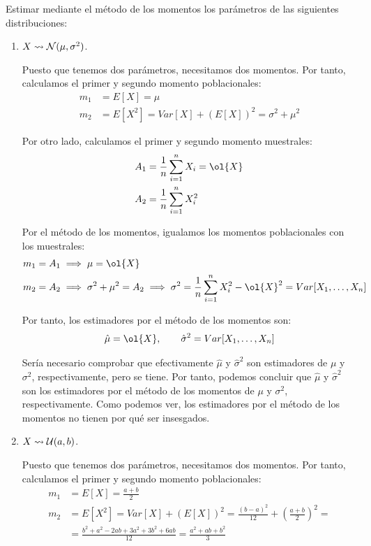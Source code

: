 \begin{ejemplo}
    Estimar mediante el método de los momentos los parámetros de las siguientes distribuciones:
    \begin{enumerate}
        \item $X \rightsquigarrow \mathcal{N}(\mu, \sigma^2)$.
        
        Puesto que tenemos dos parámetros, necesitamos dos momentos. Por tanto, calculamos el primer y segundo momento poblacionales:
        \begin{align*}
            m_1 &= E[X] = \mu\\
            m_2 &= E[X^2] = Var[X] + (E[X])^2 = \sigma^2 + \mu^2
        \end{align*}

        Por otro lado, calculamos el primer y segundo momento muestrales:
        \begin{align*}
            A_1 &= \frac{1}{n} \sum_{i=1}^{n} X_i = \ol{X}\\
            A_2 &= \frac{1}{n} \sum_{i=1}^{n} X_i^2
        \end{align*}

        Por el método de los momentos, igualamos los momentos poblacionales con los muestrales:
        \begin{align*}
            m_1 &= A_1 \implies \mu = \ol{X}\\
            m_2 &= A_2 \implies \sigma^2 + \mu^2 = A_2 \implies \sigma^2 = \frac{1}{n} \sum_{i=1}^{n} X_i^2 - \ol{X}^2 = Var[X_1, \ldots, X_n]
        \end{align*}

        Por tanto, los estimadores por el método de los momentos son:
        \begin{align*}
            \hat{\mu} = \ol{X},\qquad \hat{\sigma}^2 = Var[X_1, \ldots, X_n]
        \end{align*}

        Sería necesario comprobar que efectivamente $\hat{\mu}$ y $\hat{\sigma}^2$ son estimadores de $\mu$ y $\sigma^2$, respectivamente, pero se tiene. Por tanto, podemos concluir que $\hat{\mu}$ y $\hat{\sigma}^2$ son los estimadores por el método de los momentos de $\mu$ y $\sigma^2$, respectivamente. Como podemos ver, los estimadores por el método de los momentos no tienen por qué ser insesgados.

        \item $X \rightsquigarrow \mathcal{U}(a, b)$.
        
        Puesto que tenemos dos parámetros, necesitamos dos momentos. Por tanto, calculamos el primer y segundo momento poblacionales:
        \begin{align*}
            m_1 &= E[X] = \frac{a + b}{2}\\
            m_2 &= E[X^2] = Var[X] + (E[X])^2 = \frac{(b - a)^2}{12} + \left(\frac{a + b}{2}\right)^2 =\\&= \frac{b^2 +a^2-2ab + 3a^2 + 3b^2 + 6ab}{12} = \frac{a^2 + ab + b^2}{3}
        \end{align*}


\end{enumerate}
\end{ejemplo}
